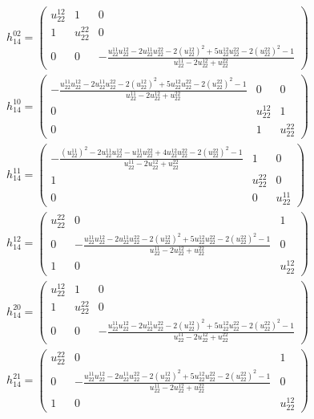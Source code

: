 \documentclass[a4paper, 11pt, twoside, onecolumn]{article}
\begin{document}
\begin{landscape}
\begin{gather*}
	 h_14^{02}=\begin{pmatrix}u^{12}_{22} & 1 & 0\\1 & u^{22}_{22} & 0\\0 & 0 & - \frac{u^{11}_{22} u^{12}_{22} - 2 u^{11}_{22} u^{22}_{22} - 2 \left(u^{12}_{22}\right)^{2} + 5 u^{12}_{22} u^{22}_{22} - 2 \left(u^{22}_{22}\right)^{2} - 1}{u^{11}_{22} - 2 u^{12}_{22} + u^{22}_{22}}\end{pmatrix}\\ 
	 h_14^{10}=\begin{pmatrix}- \frac{u^{11}_{22} u^{12}_{22} - 2 u^{11}_{22} u^{22}_{22} - 2 \left(u^{12}_{22}\right)^{2} + 5 u^{12}_{22} u^{22}_{22} - 2 \left(u^{22}_{22}\right)^{2} - 1}{u^{11}_{22} - 2 u^{12}_{22} + u^{22}_{22}} & 0 & 0\\0 & u^{12}_{22} & 1\\0 & 1 & u^{22}_{22}\end{pmatrix}\\ 
	 h_14^{11}=\begin{pmatrix}- \frac{\left(u^{11}_{22}\right)^{2} - 2 u^{11}_{22} u^{12}_{22} - u^{11}_{22} u^{22}_{22} + 4 u^{12}_{22} u^{22}_{22} - 2 \left(u^{22}_{22}\right)^{2} - 1}{u^{11}_{22} - 2 u^{12}_{22} + u^{22}_{22}} & 1 & 0\\1 & u^{22}_{22} & 0\\0 & 0 & u^{11}_{22}\end{pmatrix}\\ 
	 h_14^{12}=\begin{pmatrix}u^{22}_{22} & 0 & 1\\0 & - \frac{u^{11}_{22} u^{12}_{22} - 2 u^{11}_{22} u^{22}_{22} - 2 \left(u^{12}_{22}\right)^{2} + 5 u^{12}_{22} u^{22}_{22} - 2 \left(u^{22}_{22}\right)^{2} - 1}{u^{11}_{22} - 2 u^{12}_{22} + u^{22}_{22}} & 0\\1 & 0 & u^{12}_{22}\end{pmatrix}\\ 
	 h_14^{20}=\begin{pmatrix}u^{12}_{22} & 1 & 0\\1 & u^{22}_{22} & 0\\0 & 0 & - \frac{u^{11}_{22} u^{12}_{22} - 2 u^{11}_{22} u^{22}_{22} - 2 \left(u^{12}_{22}\right)^{2} + 5 u^{12}_{22} u^{22}_{22} - 2 \left(u^{22}_{22}\right)^{2} - 1}{u^{11}_{22} - 2 u^{12}_{22} + u^{22}_{22}}\end{pmatrix}\\ 
	 h_14^{21}=\begin{pmatrix}u^{22}_{22} & 0 & 1\\0 & - \frac{u^{11}_{22} u^{12}_{22} - 2 u^{11}_{22} u^{22}_{22} - 2 \left(u^{12}_{22}\right)^{2} + 5 u^{12}_{22} u^{22}_{22} - 2 \left(u^{22}_{22}\right)^{2} - 1}{u^{11}_{22} - 2 u^{12}_{22} + u^{22}_{22}} & 0\\1 & 0 & u^{12}_{22}\end{pmatrix}\\ 

\end{gather*}
\end{landscape}
\end{document}
